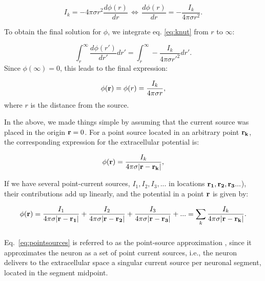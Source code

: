 \begin{equation}
I_k = -4\pi \sigma r^2  \frac{d\phi(r)}{dr} \, \iff \, \frac{d\phi(r)}{dr} = -\frac{I_k}{4\pi \sigma r^2 }.
\label{eq:knut}
\end{equation}

To obtain the final solution for $\phi$, we integrate eq. \ref{eq:knut} from $r$ to $\infty$:

\begin{equation}
\int_r^{\infty} \frac{d\phi(r')}{dr'} dr' = \int_r^{\infty} -\frac{I_k}{4\pi \sigma r'^2 } dr'.
\label{eq:knut2}
\end{equation}
Since $\phi({\infty}) = 0$, this leads to the final expression:

\begin{equation}
\phi({\bf r}) = \phi(r) = \frac{I_k}{4\pi \sigma r},
\label{eq:pointsource}
\end{equation}
where $r$ is the distance from the source.

In the above, we made things simple by assuming that the current source was placed in the origin ${\bf r} = 0$. For a point source located in an arbitrary point ${\bf r_k} $, the corresponding expression for the extracellular potential is:

\begin{equation}
\phi({\bf r}) = \frac{I_k}{4\pi \sigma |{\bf r-r_k}|},
\label{eq:pointsource2}
\end{equation}

If we have several point-current sources, $I_{1}, I_2, I_3, ... $ in locations ${\bf r_1}, {\bf r_2}, {\bf r_3} ... $), their contributions add up linearly, and the potential in a point ${\bf r}$ is given by:

\begin{equation}
\phi({\bf r}) = \frac{I_1}{4\pi  \sigma {\bf |r-r_1|}} + \frac{I_2}{4\pi  \sigma {\bf |r-r_2|} } + \frac{I_3}{4\pi  \sigma {\bf |r-r_3|} } + ... = \sum_k \frac{I_k}{4\pi  \sigma {\bf |r-r_k|} }.
\label{eq:pointsources}
\end{equation}


\subsubsection{}
Eq.~\ref{eq:pointsources} is referred to as the point-source approximation \citep{Holt1999, Pettersen2008a}, since it approximates the neuron as a set of point current sources, i.e., the neuron delivers to the extracellular space a singular current source per neuronal segment, located in the segment midpoint. 

